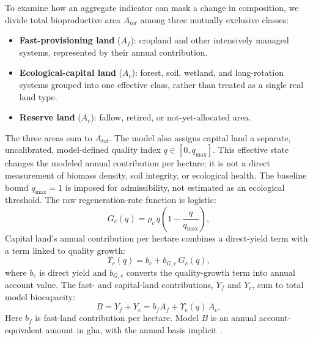 \documentclass[preprint,12pt,authoryear]{elsarticle}
\newcommand{\Ups}{\Upsilon_c}
\begin{document}
To examine how an aggregate indicator can mask a change in composition, we divide total bioproductive area $A_{tot}$ among three mutually exclusive classes:
\begin{itemize}
  \item \textbf{Fast-provisioning land} ($A_f$): cropland and other intensively managed systems, represented by their annual contribution.
  \item \textbf{Ecological-capital land} ($A_c$): forest, soil, wetland, and long-rotation systems grouped into one effective class, rather than treated as a single real land type.
  \item \textbf{Reserve land} ($A_r$): fallow, retired, or not-yet-allocated area.
\end{itemize}
The three areas sum to $A_{tot}$. The model also assigns capital land a separate, uncalibrated, model-defined quality index $q\in[0,q_{\max}]$. This effective state changes the modeled annual contribution per hectare; it is not a direct measurement of biomass density, soil integrity, or ecological health. The baseline bound $q_{\max}=1$ is imposed for admissibility, not estimated as an ecological threshold. The raw regeneration-rate function is logistic:
\begin{equation}\label{eq:Gc}
G_c(q)=\rho_c\,q\left(1-\frac{q}{q_{\max}}\right),
\end{equation}
Capital land's annual contribution per hectare combines a direct-yield term with a term linked to quality growth:
\begin{equation}\label{eq:Ups}
\Ups(q)=b_c+b_{G,c}\,G_c(q),
\end{equation}
where $b_c$ is direct yield and $b_{G,c}$ converts the quality-growth term into annual account value. The fast- and capital-land contributions, $Y_f$ and $Y_c$, sum to total model biocapacity:
\begin{equation}\label{eq:B}
B=Y_f+Y_c=b_f A_f+\Ups(q)\,A_c ,
\end{equation}
Here $b_f$ is fast-land contribution per hectare. Model $B$ is an annual account-equivalent amount in gha, with the annual basis implicit \citep{GFNStandards2009,GFNGuidebook2019}.
\end{document}
